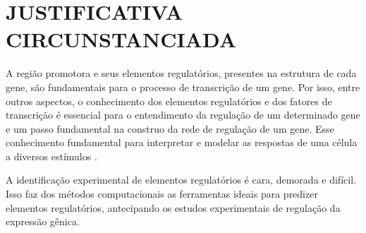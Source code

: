 \chapter{JUSTIFICATIVA CIRCUNSTANCIADA}
A região promotora e seus elementos regulatórios, presentes na estrutura de cada gene, são fundamentais para o processo de transcrição de um gene. Por isso, entre outros aspectos, o conhecimento dos elementos regulatórios e dos fatores de transcrição é essencial para o entendimento da regulação de um determinado gene \cite{WANG2009} e um passo fundamental na construo da rede de regulação de um gene.  Esse conhecimento  fundamental para interpretar e modelar as respostas de uma célula a diversos estímulos \cite{WASSERMAN2004}.

A identificação experimental de elementos regulatórios é  cara, demorada e difícil. Isso faz dos métodos computacionais as ferramentas ideais para predizer elementos regulatórios, antecipando os estudos experimentais de regulação da expressão gênica.